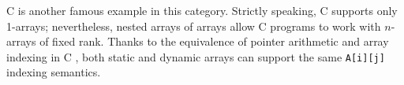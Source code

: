 \documentclass[preprint]{sigplanconf}
\newcommand{\code}[1]{\texttt{#1}}
\begin{document}
\begin{enumerate}
C is another famous example in this category. Strictly speaking, C supports
only 1-arrays; nevertheless, nested arrays of arrays allow C programs to work
with $n$-arrays of fixed rank. Thanks to the equivalence of pointer arithmetic
and array indexing in C \cite[pp.~93--96]{Kernigham:1978cp}, both static and
dynamic arrays can support the same \code{A[i][j]} indexing semantics.




%
%


\end{enumerate}
\end{document}

